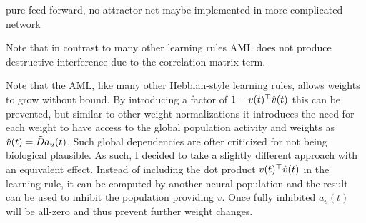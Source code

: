 pure feed forward, no attractor net
maybe implemented in more complicated network


Note that in contrast to many other learning rules AML does not produce destructive interference due to the correlation matrix term. %

Note that the AML, like many other Hebbian-style learning rules, allows weights to grow without bound.
By introducing a factor of $1 - v(t)^{\top} \hat{v}(t)$ this can be prevented, but similar to other weight normalizations it introduces the need for each weight to have access to the global population activity and weights as $\hat{v}(t) = \tilde{D} a_u(t)$.
Such global dependencies are ofter criticized for not being biological plausible.
As such, I decided to take a slightly different approach with an equivalent effect.
Instead of including the dot product $v(t)^{\top} \hat{v}(t)$ in the learning rule, it can be computed by another neural population and the result can be used to inhibit the population providing $v$.
Once fully inhibited $a_v(t)$ will be all-zero and thus prevent further weight changes.
